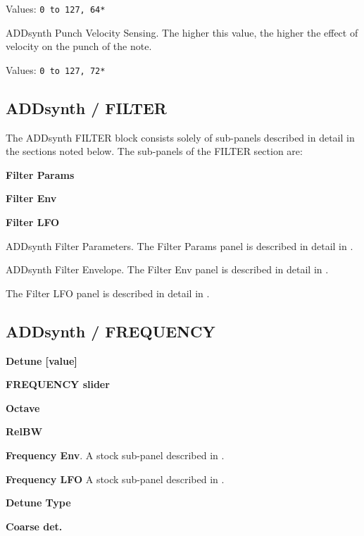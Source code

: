    Values: \texttt{0 to 127, 64*}

   ADDsynth Punch Velocity Sensing.
   The higher this value, the higher the effect of velocity on the punch of
   the note.

   Values: \texttt{0 to 127, 72*}

\subsection{ADDsynth / FILTER}
\label{subsec:addsynth_filter}

   The ADDsynth FILTER block consists solely of sub-panels
   described in detail in the sections noted below.  The
   sub-panels of the FILTER section are:

   \begin{enumber}
      \item \textbf{Filter Params}
      \item \textbf{Filter Env}
      \item \textbf{Filter LFO}
   \end{enumber}

   \setcounter{ItemCounter}{0}      %

   ADDsynth Filter Parameters.
   The Filter Params panel is described in detail in
   .

   ADDsynth Filter Envelope.
   The Filter Env panel is described in detail in
   .

   The Filter LFO panel is described in detail in
   .

\subsection{ADDsynth / FREQUENCY}
\label{subsec:addsynth_frequency}

   \begin{enumber}
      \item \textbf{Detune [value]}
      \item \textbf{FREQUENCY slider}
      \item \textbf{Octave}
      \item \textbf{RelBW}
      \item \textbf{Frequency Env}.
         A stock sub-panel described in
         .
      \item \textbf{Frequency LFO}
         A stock sub-panel described in
         .
      \item \textbf{Detune Type}
      \item \textbf{Coarse det.}
   \end{enumber}

